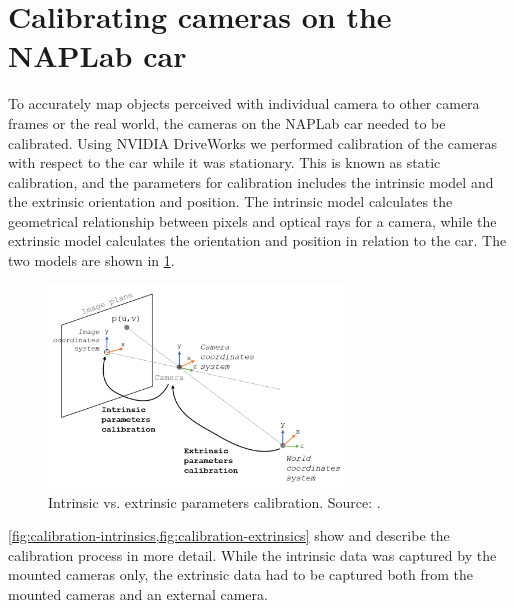 \section{Calibrating cameras on the NAPLab car}

To accurately map objects perceived with individual camera to other camera frames or the real world, the cameras on the NAPLab car needed to be calibrated. Using NVIDIA DriveWorks \cite{driveworks-camera-calibration} we performed calibration of the cameras with respect to the car while it was stationary. This is known as static calibration, and the parameters for calibration includes the intrinsic model and the extrinsic orientation and position. The intrinsic model calculates the geometrical relationship between pixels and optical rays for a camera, while the extrinsic model calculates the orientation and position in relation to the car. The two models are shown in \cref{fig:intrinsic-vs-extrinsic-calibration}.

\begin{figure}[htbp]
    \centering
    \includegraphics[width=0.7\textwidth]{chapters/3-method/figures/calibration/intrinsic-vs-extrinsic.png}
    \caption{Intrinsic vs. extrinsic parameters calibration. Source: \cite{intrinsic-vs-extrinsic-calibration}.}
    \label{fig:intrinsic-vs-extrinsic-calibration}
\end{figure}


\cref{fig:calibration-intrinsics,fig:calibration-extrinsics} show and describe the calibration process in more detail. While the intrinsic data was captured by the mounted cameras only, the extrinsic data had to be captured both from the mounted cameras and an external camera.


